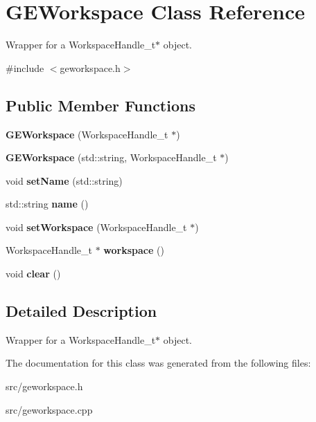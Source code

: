 \hypertarget{class_g_e_workspace}{\section{G\-E\-Workspace Class Reference}
\label{class_g_e_workspace}
}


Wrapper for a Workspace\-Handle\-\_\-t$\ast$ object.  




{\ttfamily \#include $<$geworkspace.\-h$>$}

\subsection*{Public Member Functions}
\begin{DoxyCompactItemize}
\item 
\hypertarget{class_g_e_workspace_aca53a033e0dbba102137830a59947c27}{{\bfseries G\-E\-Workspace} (Workspace\-Handle\-\_\-t $\ast$)}\label{class_g_e_workspace_aca53a033e0dbba102137830a59947c27}

\item 
\hypertarget{class_g_e_workspace_af69c4f51dc7296f09dde8c5e6a9ce8a1}{{\bfseries G\-E\-Workspace} (std\-::string, Workspace\-Handle\-\_\-t $\ast$)}\label{class_g_e_workspace_af69c4f51dc7296f09dde8c5e6a9ce8a1}

\item 
\hypertarget{class_g_e_workspace_ac623124455436e5a3c839fb1140d8bd7}{void {\bfseries set\-Name} (std\-::string)}\label{class_g_e_workspace_ac623124455436e5a3c839fb1140d8bd7}

\item 
\hypertarget{class_g_e_workspace_a679d97c4b6e78caafb74dd48161b96f1}{std\-::string {\bfseries name} ()}\label{class_g_e_workspace_a679d97c4b6e78caafb74dd48161b96f1}

\item 
\hypertarget{class_g_e_workspace_a97523ad7af7201388ba471ecc4086e72}{void {\bfseries set\-Workspace} (Workspace\-Handle\-\_\-t $\ast$)}\label{class_g_e_workspace_a97523ad7af7201388ba471ecc4086e72}

\item 
\hypertarget{class_g_e_workspace_a95451d82decc36a4bc260d0aee7e8915}{Workspace\-Handle\-\_\-t $\ast$ {\bfseries workspace} ()}\label{class_g_e_workspace_a95451d82decc36a4bc260d0aee7e8915}

\item 
\hypertarget{class_g_e_workspace_ab770508d4d56793d8c99b14714608c80}{void {\bfseries clear} ()}\label{class_g_e_workspace_ab770508d4d56793d8c99b14714608c80}

\end{DoxyCompactItemize}


\subsection{Detailed Description}
Wrapper for a Workspace\-Handle\-\_\-t$\ast$ object. 

The documentation for this class was generated from the following files\-:\begin{DoxyCompactItemize}
\item 
src/geworkspace.\-h\item 
src/geworkspace.\-cpp\end{DoxyCompactItemize}
